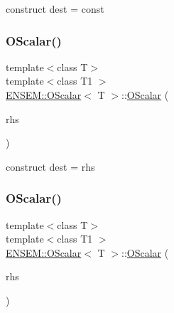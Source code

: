 construct dest = const 

\mbox{\label{classENSEM_1_1OScalar_a12d201aefa6cbf8648247fdcc6f08669}} 
\subsubsection{\texorpdfstring{OScalar()}{OScalar()}\hspace{0.1cm}{\footnotesize\ttfamily [3/12]}}
{\footnotesize\ttfamily template$<$class T$>$ \\
template$<$class T1 $>$ \\
\mbox{\hyperlink{classENSEM_1_1OScalar}{E\+N\+S\+E\+M\+::\+O\+Scalar}}$<$ T $>$\+::\mbox{\hyperlink{classENSEM_1_1OScalar}{O\+Scalar}} (\begin{DoxyParamCaption}\item[{const \mbox{\hyperlink{classENSEM_1_1OScalar}{O\+Scalar}}$<$ T1 $>$ \&}]{rhs }\end{DoxyParamCaption})\hspace{0.3cm}{\ttfamily [inline]}}



construct dest = rhs 

\mbox{\label{classENSEM_1_1OScalar_a63525278c1ba085f57cdc4aafe50aaa9}} 
\subsubsection{\texorpdfstring{OScalar()}{OScalar()}\hspace{0.1cm}{\footnotesize\ttfamily [4/12]}}
{\footnotesize\ttfamily template$<$class T$>$ \\
template$<$class T1 $>$ \\
\mbox{\hyperlink{classENSEM_1_1OScalar}{E\+N\+S\+E\+M\+::\+O\+Scalar}}$<$ T $>$\+::\mbox{\hyperlink{classENSEM_1_1OScalar}{O\+Scalar}} (\begin{DoxyParamCaption}\item[{const T1 \&}]{rhs }\end{DoxyParamCaption})\hspace{0.3cm}{\ttfamily [inline]}}




